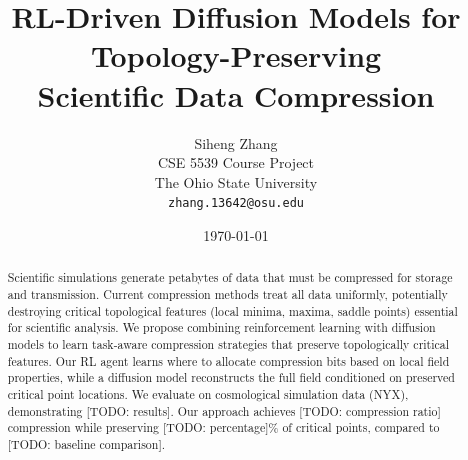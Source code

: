 \documentclass[11pt]{article}
\title{RL-Driven Diffusion Models for Topology-Preserving\\Scientific Data Compression}
\author{
    Siheng Zhang\\
    CSE 5539 Course Project\\
    The Ohio State University\\
    \texttt{zhang.13642@osu.edu}
}
\date{\today}
\begin{document}
\maketitle

\begin{abstract}
Scientific simulations generate petabytes of data that must be compressed for storage and transmission. Current compression methods treat all data uniformly, potentially destroying critical topological features (local minima, maxima, saddle points) essential for scientific analysis. We propose combining reinforcement learning with diffusion models to learn task-aware compression strategies that preserve topologically critical features. Our RL agent learns where to allocate compression bits based on local field properties, while a diffusion model reconstructs the full field conditioned on preserved critical point locations. We evaluate on cosmological simulation data (NYX), demonstrating [TODO: results]. Our approach achieves [TODO: compression ratio] compression while preserving [TODO: percentage]\% of critical points, compared to [TODO: baseline comparison].
\end{abstract}















\end{document}
